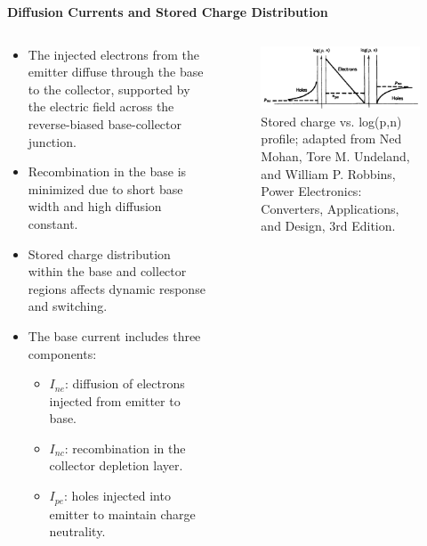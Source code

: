 \begin{frame}{\textbf{Diffusion Currents and Stored Charge Distribution}}
\begin{columns}
\begin{column}{0.6\textwidth}
\begin{itemize}
    \item The injected electrons from the emitter diffuse through the base to the collector, supported by the electric field across the reverse-biased base-collector junction.
    \item Recombination in the base is minimized due to short base width and high diffusion constant.
    \item Stored charge distribution within the base and collector regions affects dynamic response and switching.
    \item The base current includes three components:
    \begin{itemize}
        \item $I_{ne}$: diffusion of electrons injected from emitter to base.
        \item $I_{nc}$: recombination in the collector depletion layer.
        \item $I_{pe}$: holes injected into emitter to maintain charge neutrality.
    \end{itemize}
\end{itemize}
\end{column}

\begin{column}{0.4\textwidth}
\begin{figure}
    \centering
    \includegraphics[width=1\textwidth]{fig/lec04/stored_charge_BJT.png}
    \caption{Stored charge vs. log(p,n) profile; adapted from Ned Mohan, Tore M. Undeland, and William P. Robbins, Power Electronics: Converters, Applications, and Design, 3rd Edition.}
\end{figure}
\end{column}
\end{columns}
\end{frame}


